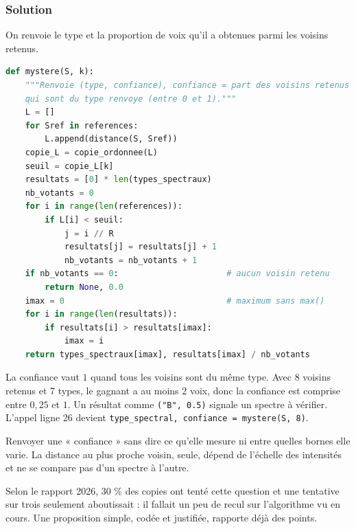 \documentclass[11pt,a4paper]{article}
\begin{document}
\hypertarget{solution-20}{%
\subsubsection{Solution}\label{solution-20}}

On renvoie le type et la proportion de voix qu'il a obtenues parmi les voisins retenus.

\begin{lstlisting}[language=Python]
def mystere(S, k):
    """Renvoie (type, confiance), confiance = part des voisins retenus
    qui sont du type renvoye (entre 0 et 1)."""
    L = []
    for Sref in references:
        L.append(distance(S, Sref))
    copie_L = copie_ordonnee(L)
    seuil = copie_L[k]
    resultats = [0] * len(types_spectraux)
    nb_votants = 0
    for i in range(len(references)):
        if L[i] < seuil:
            j = i // R
            resultats[j] = resultats[j] + 1
            nb_votants = nb_votants + 1
    if nb_votants == 0:                      # aucun voisin retenu
        return None, 0.0
    imax = 0                                 # maximum sans max()
    for i in range(len(resultats)):
        if resultats[i] > resultats[imax]:
            imax = i
    return types_spectraux[imax], resultats[imax] / nb_votants
\end{lstlisting}

La confiance vaut \(1\) quand tous les voisins sont du même type. Avec 8 voisins retenus et 7 types, le gagnant a au moins 2 voix, donc la confiance est comprise entre \(0{,}25\) et \(1\). Un résultat comme \texttt{("B",\ 0.5)} signale un spectre à vérifier. L'appel ligne 26 devient \texttt{type\_spectral,\allowbreak{}\ confiance\ =\allowbreak{}\ mystere(\allowbreak{}S,\allowbreak{}\ 8)\allowbreak{}}.

\begin{piege}

Renvoyer une « confiance » sans dire ce qu'elle mesure ni entre quelles bornes elle varie. La distance au plus proche voisin, seule, dépend de l'échelle des intensités et ne se compare pas d'un spectre à l'autre.

\end{piege}

\begin{jury}

Selon le rapport 2026, 30 \% des copies ont tenté cette question et une tentative sur trois seulement aboutissait : il fallait un peu de recul sur l'algorithme vu en cours. Une proposition simple, codée et justifiée, rapporte déjà des points.

\end{jury}
\end{document}
